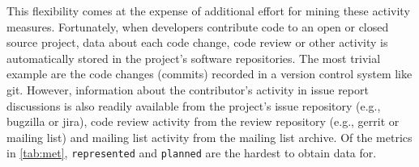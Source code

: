 This flexibility comes at the expense of additional effort for mining these activity measures. %
Fortunately, when developers contribute code to an open or closed source project, data about each code change, code review or other activity is automatically stored in the project's software repositories. The most trivial example are the code changes (commits) recorded in a version control system like git. However, information about the contributor's activity in issue report discussions is also readily available from the project's issue repository (e.g., bugzilla or jira), code review activity from the review repository (e.g., gerrit or mailing list) and mailing list activity from the mailing list archive. Of the metrics in \autoref{tab:met}, \texttt{represented} and \texttt{planned} are the hardest to obtain data for. 
%
%
%






